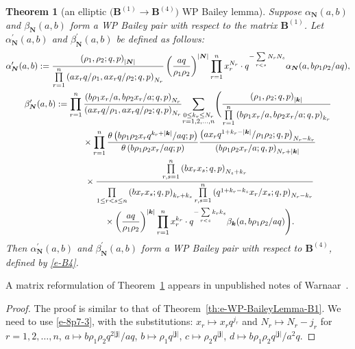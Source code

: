 \documentclass[pdftex]{sigma}
\numberwithin{equation}{section}
\newtheorem{Theorem}{Theorem}[section]
\newenvironment{Remark*}{\begin{remark*}\normalfont}{\end{remark*}}
\newcommand{\sumN}{{\left| \boldsymbol{N} \right|}}
\newcommand\sumj{{\left| \boldsymbol {j} \right|}}
\newcommand\sumk{{\left| \boldsymbol{k} \right|}}
\newcommand{\B}{{ \mathbf B}}
\newcommand{\N}{{ \boldsymbol N}}
\renewcommand{\k}{{ \boldsymbol{k}}}
\newcommand{\multsum}[3]{{\sum\limits_{\substack{{0\le #1_#3 \le #2_#3} \\
{#3 =1,2,\dots, n}}}}}
\newcommand{\triprod}[1]{\prod\limits_{1\le r < s \le #1}}
\newcommand{\sqprod}[1]{\prod\limits_{r, s =1}^{#1}} %
\newcommand{\smallprod}[1]{\prod\limits_{r =1}^{#1}} %
\newcommand{\xover}[1]{#1_{r}/#1_{s}}
\newcommand{\ellipticqrfac}[2]{{\left({#1}; q, p\right)_{#2}}} %
\newcommand{\elliptictheta}[1]{\theta \left({#1} ; p\right) }
\begin{document}
\begin{Theorem}[an elliptic $\big(\B^{(1)} \to\B^{(4)}\big)$ WP Bailey lemma] \label{th:e-WP-BaileyLemma-B1-B4}
Suppose $\alpha_\N(a,b)$ and $\beta_\N(a,b)$ form a WP Bailey pair with respect to the matrix $\B^{(1)}$. Let
${\alpha}^{\prime}_\N(a,b)$ and ${\beta}^{\prime}_\N(a,b)$ be defined as follows:
\begin{gather*}
{\alpha}^{\prime}_\N(a,b) := \frac{\ellipticqrfac{\rho_1, \rho_2}{\sumN}}
 {\smallprod n \ellipticqrfac{ax_rq/\rho_1, ax_rq/\rho_2}{N_r}}
 \left(\frac{aq}{\rho_1\rho_2}\right)^{\sumN}
\smallprod n x_r^{N_r}\cdot q^{-\sum\limits_{r<s} N_rN_s} \alpha_\N(a, b\rho_1\rho_2/aq),\\
{\beta}^{\prime}_\N (a,b) :=
\smallprod n \frac{\ellipticqrfac{b\rho_1x_r/a, b\rho_2x_r/a }{N_r}}
{ \ellipticqrfac{ax_rq/\rho_1, ax_rq/\rho_2}{N_r}} \multsum{k}{N}{r} \Bigg(
 \frac{ \ellipticqrfac{\rho_1, \rho_2}{\sumk}}
{\smallprod n \ellipticqrfac{b\rho_1x_r/a, b\rho_2x_r/a}{k_r}}\\
\hphantom{{\beta}^{\prime}_\N (a,b) :=}{} \times
\smallprod n \frac{\elliptictheta{ b\rho_1\rho_2x_rq^{k_r+\sumk}/{aq}}}
{\elliptictheta{ b\rho_1\rho_2x_r/{aq}}}
\frac{ \ellipticqrfac{ax_rq^{1+k_r-\sumk}/\rho_1\rho_2 }{N_r-k_r}}{
\ellipticqrfac{b\rho_1\rho_2 x_r/a}{N_r+\sumk}} \notag\\
\hphantom{{\beta}^{\prime}_\N (a,b) :=}{} \times
\frac{\sqprod n \ellipticqrfac{bx_rx_s}{N_s+k_r}}{\triprod n \ellipticqrfac{bx_rx_s}{k_r+k_s}
\sqprod n \ellipticqrfac{q^{1+k_r-k_s}\xover x }{N_r-k_r}}\\
\hphantom{{\beta}^{\prime}_\N (a,b) :=}{} \times
\left(\frac{aq}{\rho_1\rho_2}\right)^{\sumk} \smallprod n x_r^{k_r}\cdot q^{-\sum\limits_{r<s} k_rk_s} \beta_\k(a,b\rho_1\rho_2/aq) \Bigg).%
\end{gather*}
Then ${\alpha}^{\prime}_\N(a,b)$ and ${\beta}^{\prime}_\N(a,b)$ form a WP Bailey pair with respect to $\B^{(4)}$, defined by \eqref{e-B4}.
\end{Theorem}
\begin{Remark*} A matrix reformulation of Theorem~\ref{th:e-WP-BaileyLemma-B1-B4} appears in unpublished notes of Warnaar~\cite{SOW-notes-2016}.
\end{Remark*}

\begin{proof} The proof is similar to that of Theorem~\ref{th:e-WP-BaileyLemma-B1}. We need to use \eqref{e-8p7-3}, with the substitutions: $x_r\mapsto x_rq^{j_r}$ and $N_r\mapsto N_r-j_r$ for $r=1, 2, \dots, n$, $a\mapsto b\rho_1\rho_2q^{2\sumj}/aq$, $b\mapsto \rho_1q^{\sumj}$, $c\mapsto \rho_2q^{\sumj}$, $d\mapsto b\rho_1\rho_2q^{\sumj}/a^2q $.
\end{proof}
\end{document}
